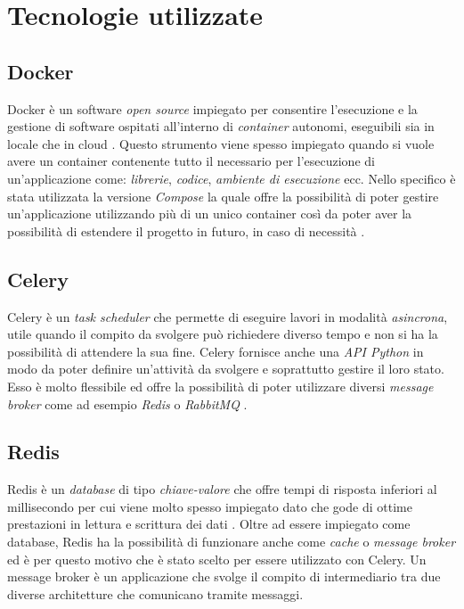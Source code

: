 \section{Tecnologie utilizzate}
\subsection{Docker}
Docker è un software \emph{open source} impiegato per consentire l’esecuzione e la gestione di software ospitati all’interno di \emph{container} autonomi, eseguibili sia in locale che in cloud \cite{cont}. Questo strumento viene spesso impiegato quando si vuole avere un container contenente tutto il necessario per l’esecuzione di un’applicazione come: \emph{librerie}, \emph{codice}, \emph{ambiente di esecuzione} ecc.
Nello specifico è stata utilizzata la versione \emph{Compose} la quale offre la possibilità di poter gestire un’applicazione utilizzando più di un unico container così da poter aver la possibilità di estendere il progetto in futuro, in caso di necessità \cite{compose}.

\subsection{Celery}
Celery è un \emph{task scheduler} che permette di eseguire lavori in modalità \emph{asincrona}, utile quando il compito da svolgere può richiedere diverso tempo e non si ha la possibilità di attendere la sua fine. Celery fornisce anche una \emph{API Python} in modo da poter definire un'attività da svolgere e soprattutto gestire il loro stato. Esso è molto flessibile ed offre la possibilità di poter utilizzare diversi \emph{message broker} come ad esempio \emph{Redis} o \emph{RabbitMQ} \cite{broker}.

\subsection{Redis}
Redis è un \emph{database} di tipo \emph{chiave-valore} che offre tempi di risposta inferiori al millisecondo per cui viene molto spesso impiegato dato che gode di ottime prestazioni in lettura e scrittura dei dati \cite{kv}. Oltre ad essere impiegato come database, Redis ha la possibilità di funzionare anche come \emph{cache} o \emph{message broker} ed è per questo motivo che è stato scelto per essere utilizzato con Celery. Un message broker è un applicazione che svolge il compito di intermediario tra due diverse architetture che comunicano tramite messaggi.

